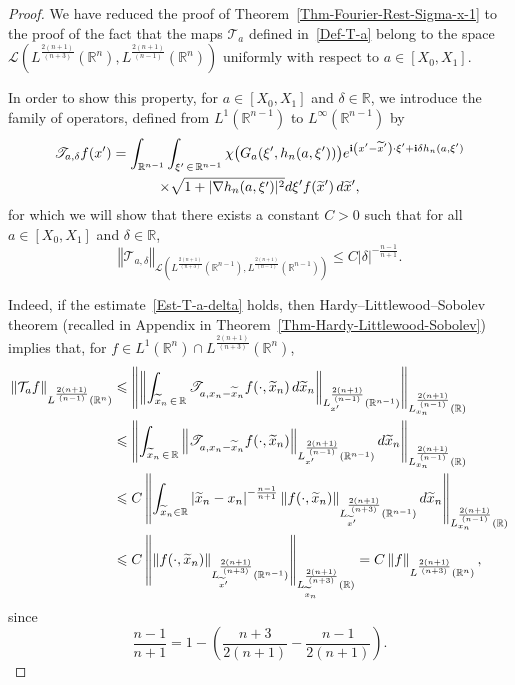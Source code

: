 \documentclass[10pt]{amsart}
\theoremstyle{definition}\newtheorem{defi}[theo]{Definition}\newtheorem{rema}[theo]{Remark}\newtheorem{exam}[theo]{Example}\newtheorem{exem}[theo]{Example}\newtheorem{nota}[theo]{Notation}
\newcommand{\scL}{\mathscr{L}}
\newcommand{\scT}{\mathscr{T}}
\newcommand*\R{\mathbb{R}}
\renewcommand{\i}{\mathbf{i}}
\newcommand{\clT}{\mathcal{T}}
\newcommand{\norm}[1]{\left\Vert#1\right\Vert}
\renewcommand{\leq}{\leqslant}
\renewcommand{\tilde}{\widetilde}
\let\oldtilde\tilde
\renewcommand*{\tilde}[1]{\mathchoice{\widetilde{#1}}{\widetilde{#1}}{\oldtilde{#1}}{\oldtilde{#1}}}
\begin{document}
\begin{proof}
We have reduced the proof of Theorem~\ref{Thm-Fourier-Rest-Sigma-x-1} to the proof of the fact that the maps $\clT_a$ defined in~\eqref{Def-T-a} belong to the space $\scL(L^{\frac{2(n+1)}{(n+3)}}(\R^n), L^{\frac{2(n+1)}{(n-1)}}(\R^n))$ uniformly with respect to $a \in [X_0, X_1]$.

In order to show this property, for $a \in [X_0, X_1]$ and $\delta \in \R$, we introduce the family of operators, defined from $L^{1}(\R^{n-1})$ to $L^\infty(\R^{n-1})$ by
\begin{multline*}\label{Def-T-a-delta}
\scT_{a,\delta} f(x') =
\int_{\R^{n-1}}
\int_{\xi'\,\in\,\R^{n-1}}
\chi\big(G_a(\xi', h_n(a,\xi'))\big) e^{\i \left(x' - \tilde x'\right)\cdot \xi' + \i \delta h_n(a,\xi')}
\\
\times
\sqrt{1 + |\nabla h_n(a,\xi')|^2} d \xi' f(\tilde x')
\, d \tilde x',
\end{multline*}
for which we will show that there exists a constant $C>0$ such that for all $a \in [X_0, X_1]$ and $\delta \in \R$,
\begin{equation}\label{Est-T-a-delta}
\norm{ \scT_{a, \delta}}_{\scL\left(L^{\frac{2(n+1)}{(n+3)}}\left(\R^{n-1}\right), L^{\frac{2(n+1)}{(n-1)}}\left(\R^{n-1}\right)\right)}
\leqslant C | \delta|^{-\frac{n-1}{n+1}}.
\end{equation}

Indeed, if the estimate~\eqref{Est-T-a-delta} holds, then Hardy--Littlewood--Sobolev theorem (recalled in Appendix in Theorem~\ref{Thm-Hardy-Littlewood-Sobolev}) implies that, for $f \in L^1(\R^{n}) \cap L^{\frac{2(n+1)}{(n+3)}}(\R^n)$,
\begin{align*}
\norm{ \clT_a f }_{L^{\frac{2(n+1)}{(n-1)}}(\R^n)} &
\leq
\norm{ \norm{ \int_{\tilde x_n\, \in\,\R} \scT_{a, x_n - \tilde x_n } f(\cdot, \tilde x_n) \, d\tilde x_n }_{L^{\frac{2(n+1)}{(n-1)}}_{x'}\left(\R^{n-1}\right)}}_{L^{\frac{2(n+1)}{(n-1)}}_{x_n}(\R)}
\\
&
\leq
\norm{\int_{\tilde x_n\,\in\,\R} \norm{\scT_{a, x_n -\tilde x_n } f(\cdot, \tilde x_n) }_{L^{\frac{2(n+1)}{(n-1)}}_{x'}(\R^{n-1})}d\tilde x_n}_{L^{\frac{2(n+1)}{(n-1)}}_{x_n}(\R)}
\\
&
\leq C \norm{\int_{\tilde x_n \in \R} \left| \tilde x_n - x_n\right|^{-\frac{n-1}{n+1}} \norm{f(\cdot, \tilde x_n) }_{L^{\frac{2(n+1)}{(n+3)}}_{\tilde x'}\left(\R^{n-1}\right)} d\tilde x_n}_{L^{\frac{2(n+1)}{(n-1)}}_{x_n}(\R)}
\\
&
\leq C \norm{ \norm{f(\cdot, \tilde x_n) }_{L^{\frac{2(n+1)}{(n+3)}}_{\tilde x'}\left(\R^{n-1}\right)}}_{L^{\frac{2(n+1)}{(n+3)}}_{\tilde x_n}(\R)} = C \norm{f}_{L^{\frac{2(n+1)}{(n+3)}}\left(\R^n\right)},
\end{align*}
since
\[
\frac{n-1}{n+1} = 1 - \left(\frac{n+3}{2(n+1)} - \frac{n-1}{2(n+1)}\right).
\]


\end{proof}
\end{document}
